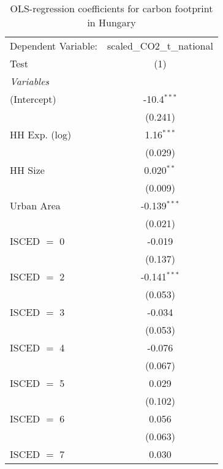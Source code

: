 
\begin{table}[htbp!]
   \centering
   \small
   \begin{adjustbox}{width = 1\textwidth, max height = 0.95\textheight, center}
      \begin{threeparttable}[b]
         \caption{\label{tab:OLS_2_HUN} OLS-regression coefficients for carbon footprint in Hungary}
         \begin{tabular}{lc}
            \tabularnewline \midrule \midrule
            Dependent Variable: & scaled\_CO2\_t\_national\\     
            Test                & (1)\\  
            \midrule
            \emph{Variables}\\
            (Intercept)         & -10.4$^{***}$\\   
                                & (0.241)\\   
            HH Exp. (log)       & 1.16$^{***}$\\   
                                & (0.029)\\   
            HH Size             & 0.020$^{**}$\\   
                                & (0.009)\\   
            Urban Area          & -0.139$^{***}$\\   
                                & (0.021)\\   
            ISCED $=$ 0         & -0.019\\   
                                & (0.137)\\   
            ISCED $=$ 2         & -0.141$^{***}$\\   
                                & (0.053)\\   
            ISCED $=$ 3         & -0.034\\   
                                & (0.053)\\   
            ISCED $=$ 4         & -0.076\\   
                                & (0.067)\\   
            ISCED $=$ 5         & 0.029\\   
                                & (0.102)\\   
            ISCED $=$ 6         & 0.056\\   
                                & (0.063)\\   
            ISCED $=$ 7         & 0.030\\   

\end{tabular}
\end{threeparttable}
\end{adjustbox}
\end{table}
